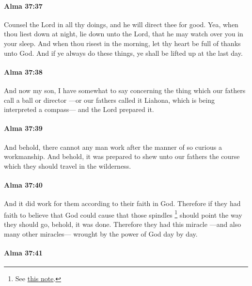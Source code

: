 		\paragraph{Alma 37:37} %
			\label{ALMA-37-37}

			Counsel the Lord in all thy doings,
			and he will direct thee for good.
			Yea, when thou liest down at night,
			lie down unto the Lord,
			that he may watch over you in your sleep.
			And when thou risest in the morning,
			let thy heart be full of thanks unto God.
			And if ye always do these things,
			ye shall be lifted up at the last day.

		\paragraph{Alma 37:38} %
			\label{ALMA-37-38}

			And now my son, I have somewhat to say
			concerning the thing which our fathers call a ball or director
			---or our fathers called it Liahona,
			which is being interpreted a compass---
			and the Lord prepared it.

		\paragraph{Alma 37:39} %
			\label{ALMA-37-39}

			And behold, there cannot any man work
			after the manner of so curious a workmanship.
			And behold, it was prepared to shew unto our fathers
			the course which they should travel in the wilderness.

		\paragraph{Alma 37:40} %
			\label{ALMA-37-40}

			And it did work for them according to their faith in God.
			Therefore if they had faith to believe
			that God could cause that those spindles%
				\footnote{%
					\label{ALMA-37-40-NOTE-spindles}%
					See \hyperref[1NEPHI-16-10-NOTE-spindles]{this note}.
					}
			should point the way they should go,
			behold, it was done.
			Therefore they had this miracle
			---and also many other miracles---
			wrought by the power of God day by day.

		\paragraph{Alma 37:41} %
			\label{ALMA-37-41}

